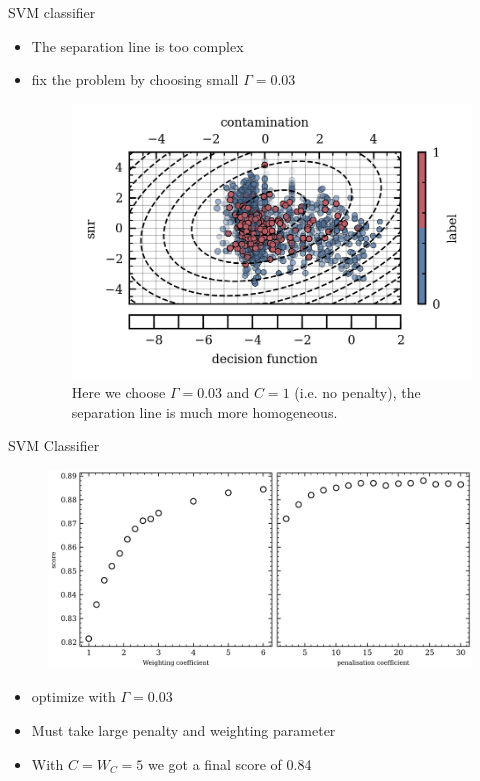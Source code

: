 \documentclass[numbering=fraction]{beamer}
\begin{document}
\begin{frame}{SVM classifier}
    \begin{itemize}
        \item The separation line is too complex
        \item fix the problem by choosing small $\Gamma = 0.03$
              \begin{figure}[H]
                  \centering
                  \includegraphics[width=0.7\linewidth]{figure/decision_function_working_5.png}
                  \caption{\scriptsize{Here we choose $\Gamma = 0.03$ and $C = 1$ (i.e. no penalty), the separation line is much more homogeneous.}}
              \end{figure}
    \end{itemize}
\end{frame}
\begin{frame}{SVM Classifier}
    \begin{figure}[H]
        \centering
        \includegraphics[width=.7\linewidth]{figure/score.png}
    \end{figure}
    \begin{itemize}
        \item optimize with $\Gamma = 0.03$
        \item Must take large penalty and weighting parameter
        \item With $C = W_C = 5$ we got a final score of 0.84
    \end{itemize}
\end{frame}
\end{document}
